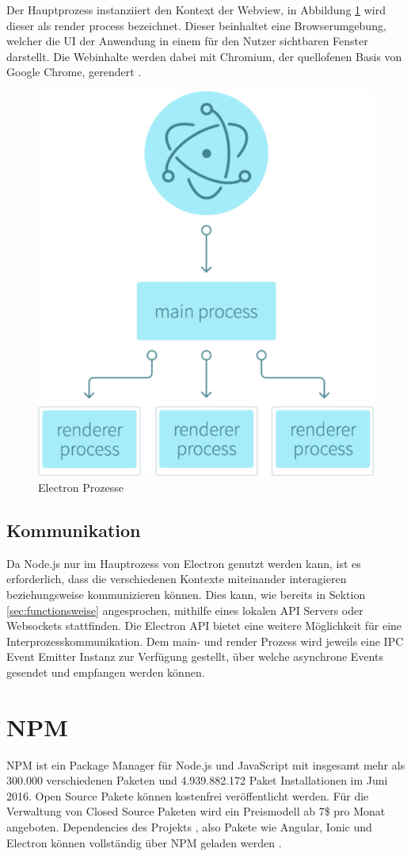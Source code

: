 Der Hauptprozess instanziiert den Kontext der Webview, in Abbildung \ref{fig:electronprozess} wird dieser als render process bezeichnet.
Dieser beinhaltet eine Browserumgebung, welcher die \ac{UI} der Anwendung in einem für den Nutzer sichtbaren Fenster darstellt.
Die Webinhalte werden dabei mit Chromium, der quellofenen Basis von Google Chrome, gerendert \cite{Build58:online}.

\begin{figure}[htbp]
 \centering
 \includegraphics[width=0.4\linewidth]{kapitel3/electron-context.png}
 \caption{Electron Prozesse \cite{Build58:online}}
\label{fig:electronprozess}
\end{figure}


\subsection{Kommunikation}
\label{sec:Kommunikation}

Da Node.js nur im Hauptrozess von Electron genutzt werden kann, ist es erforderlich,
dass die verschiedenen Kontexte miteinander interagieren beziehungsweise kommunizieren können.
Dies kann, wie bereits in Sektion \ref{sec:functionsweise} angesprochen,
mithilfe eines lokalen API Servers oder Websockets stattfinden.
Die Electron API bietet eine weitere Möglichkeit für eine Interprozesskommunikation.
Dem main- und render Prozess wird jeweils eine IPC Event Emitter Instanz zur Verfügung gestellt,
über welche asynchrone Events gesendet und empfangen werden können.

\section{\ac{NPM}}

\ac{NPM} ist ein Package Manager für Node.js und JavaScript mit insgesamt mehr als 300.000 verschiedenen Paketen und
4.939.882.172 Paket Installationen im Juni 2016.
Open Source Pakete können kostenfrei veröffentlicht werden.
Für die Verwaltung von Closed Source Paketen wird ein Preismodell ab 7\$ pro Monat angeboten.
Dependencies des Projekts \projectname{}, also Pakete wie Angular, Ionic und Electron können vollständig
über \ac{NPM} geladen werden \cite{npm31:online}.

